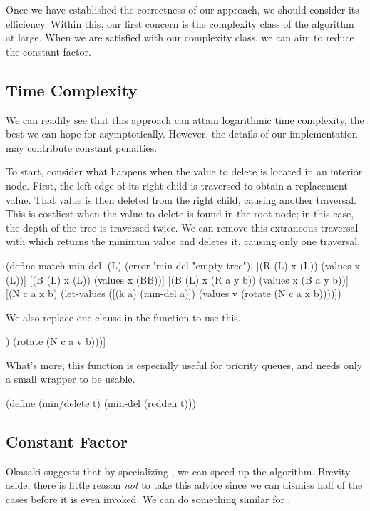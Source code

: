 \documentclass[preprint]{sigplanconf}
\begin{document}
Once we have established the correctness of our approach, we should consider its efficiency. Within this, our first concern is the complexity class of the algorithm at large. When we are satisfied with our complexity class, we can aim to reduce the constant factor.

\subsection{Time Complexity}

We can readily see that this approach can attain logarithmic time complexity, the best we can hope for asymptotically. However, the details of our implementation may contribute constant penalties.

To start, consider what happens when the value to delete is located in an interior node. First, the left edge of its right child is traversed to obtain a replacement value. That value is then deleted from the right child, causing another traversal. This is costliest when the value to delete is found in the root node; in this case, the depth of the tree is traversed twice. We can remove this extraneous traversal with  which returns the minimum value and deletes it, causing only one traversal.
\begin{schemedisplay}
(define-match min-del
  [(L) (error 'min-del "empty tree")]
  [(R (L) x (L)) (values x (L))]
  [(B (L) x (L)) (values x (BB))]
  [(B (L) x (R a y b)) (values x (B a y b))]
  [(N c a x b) (let-values ([(k a) (min-del a)])
                 (values v (rotate (N c a x b))))])
\end{schemedisplay}
We also replace one clause in the  function to use this.
\begin{schemedisplay}
[= (let-values ([(v b) (min-del b)])
     (rotate (N c a v b)))]
\end{schemedisplay}

What's more, this function is especially useful for priority queues, and needs only a small wrapper to be usable.
\begin{schemedisplay}
  (define (min/delete t)
    (min-del (redden t)))
\end{schemedisplay}

\subsection{Constant Factor}

Okasaki suggests that by specializing , we can speed up the algorithm. Brevity aside, there is little reason \emph{not} to take this advice since we can dismiss half of the  cases before it is even invoked. We can do something similar for .
\end{document}
